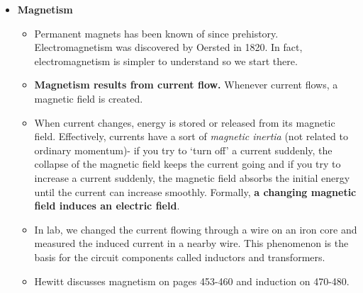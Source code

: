 \documentclass{article}
\begin{document}
\begin{itemize}
\newpage{}

\item \textbf{Magnetism}
  \begin{itemize}
    \item Permanent magnets has been known of since prehistory.
          Electromagnetism was discovered by Oersted in 1820.
          In fact, electromagnetism is simpler to understand so we start there.
    \item \textbf{Magnetism results from current flow.} Whenever current flows,
          a magnetic field is created.
    \item When current changes, energy is stored or released from its magnetic
          field. Effectively, currents have a sort of \textit{magnetic inertia} 
          (not related to ordinary momentum)- if you try to `turn off' a 
          current suddenly, the collapse of the magnetic field keeps the 
          current going and if you try to increase a current suddenly, the 
          magnetic field absorbs the initial energy until the current can 
          increase smoothly. Formally, \textbf{a changing magnetic field induces
          an electric field}.
    \item In lab, we changed the current flowing through a wire on an iron core
          and measured the induced current in a nearby wire. This phenomenon
          is the basis for the circuit components called inductors and 
          transformers.
    \item Hewitt discusses magnetism on pages 453-460 and induction on 470-480.
  \end{itemize}


\end{itemize}
\end{document}
